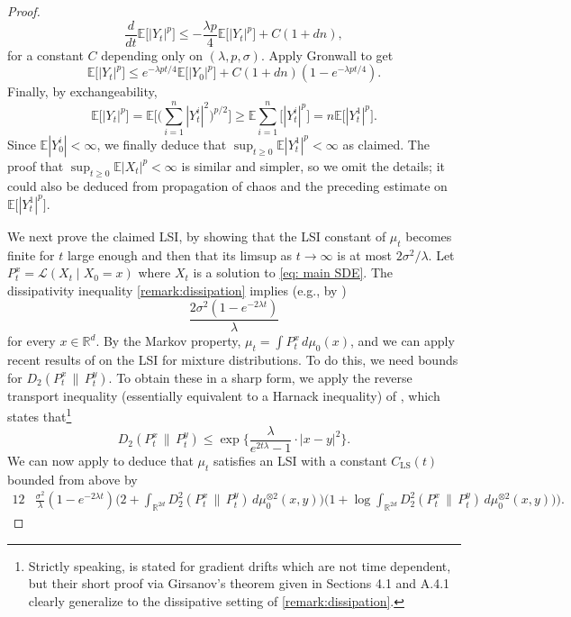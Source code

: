 \documentclass[11pt,reqno]{amsart}
\numberwithin{equation}{section}
\theoremstyle{definition}
\def\E{{\mathbb E}}
\def\R{{\mathbb R}}
\def\Law{\mathcal{L}}
\begin{document}
\begin{proof}
\[
\frac{d}{dt}\E\big[|Y_t|^p\big] \le -\frac{\lambda p}{4}\E\big[|Y_t|^p\big] + C(1+dn),
\]
for a constant $C$ depending only on $(\lambda,p,\sigma)$. Apply Gronwall to get 
\[
\E\big[|Y_t|^p\big] \le e^{-\lambda p t/4}\E\big[|Y_0|^p\big] + C(1+dn)(1-e^{-\lambda p t/4}).
\]
Finally, by exchangeability,
\[
\E\big[|Y_t|^p\big]= \E\bigg[ \Big(\sum_{i=1}^n |Y^i_t|^2\Big)^{p/2}\bigg] \ge \E\sum_{i=1}^n \big[|Y^i_t|^p\big] = n\E\big[|Y^1_t|^p\big].
\]
Since $\E|Y_0^i| < \infty$, we finally deduce that $\sup_{t \ge 0}\E|Y^1_t|^p < \infty$ as claimed. The proof that $\sup_{t \ge 0}\E|X_t|^p < \infty$ is similar and simpler, so we omit the details; it could also be deduced from propagation of chaos and the preceding estimate on $\E\Big[|Y^1_t|^p\Big]$.


We next prove the claimed LSI, by showing that the LSI constant of $\mu_t$ becomes finite for $t$ large enough and then that its limsup as $t\to\infty$ is at most $2\sigma^2/\lambda$.
    Let $P_t^x=\Law(X_t\mid X_0=x)$ where $X_t$ is a solution to \eqref{eq: main SDE}. The dissipativity inequality \eqref{remark:dissipation} implies (e.g., by \cite[Theorem 4.1]{collet2008logarithmic}) 
    \[\frac{2\sigma^2(1-e^{-2\lambda t})}{\lambda}\]
     for every $x \in \R^d$.
    By the Markov property, $\mu_t=\int P_t^x\,d\mu_0(x)$, and we can apply  recent results of \cite{Chen2021-ch} on the LSI for mixture distributions. To do this, we need bounds for $D_2(P_t^x\,\|\,P_t^y)$.
    To obtain these in a sharp form, we apply the reverse transport inequality (essentially equivalent to a Harnack inequality) of \cite[Theorem 6.1(5)]{HarnackInequalities}, which states that\footnote{Strictly speaking, \cite[Theorem 6.1(5)]{HarnackInequalities} is stated for gradient drifts which are not time dependent, but their short proof via Girsanov's theorem given in Sections 4.1 and A.4.1 clearly generalize to the dissipative setting of \eqref{remark:dissipation}.}
    \begin{equation}
        D_2(P_t^x\,\|\,P_t^y)\leq \exp\Big\{\frac{\lambda}{e^{2t\lambda}-1} \cdot |x-y|^2\Big\}.
    \end{equation}
    We can now apply \cite[Theorem 1(2)]{Chen2021-ch} to deduce that $\mu_t$ satisfies an LSI with a constant $C_{\text{LS}}(t)$ bounded from above by  
    \begin{align*}
           12 &\frac{\sigma^2}{\lambda}(1-e^{-2{\lambda t}})\Big(2+\int_{\R^{2d}}D_2^2(P_t^x\,\|\,P_t^y)\,d\mu_0^{\otimes 2}(x,y)\Big)\Big(1+\log \int_{\R^{2d}}D_2^2(P_t^x\,\|\,P_t^y)\,d\mu_0^{\otimes 2}(x,y))\Big) .

\end{align*}
\end{proof}
\end{document}
